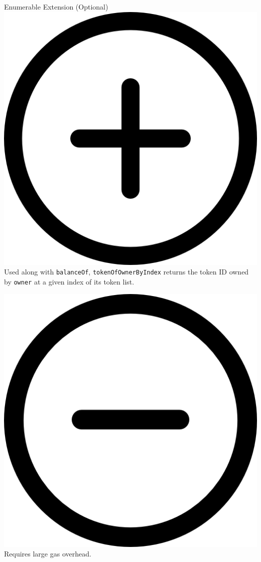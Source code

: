 \documentclass[handout]{beamer}
\begin{document}
\begin{frame}{Enumerable Extension (Optional)}
	\includegraphics[scale=0.02]{../assets/images/plus_circle.png}
	Used along with \texttt{balanceOf}, \texttt{tokenOfOwnerByIndex} returns the token ID owned by \texttt{owner} at a given index of its token list.\vspace{0.5em}

	\includegraphics[scale=0.02]{../assets/images/minus_circle.png}
	 Requires large gas overhead. \vspace{1em}
 

\end{frame}
\end{document}
